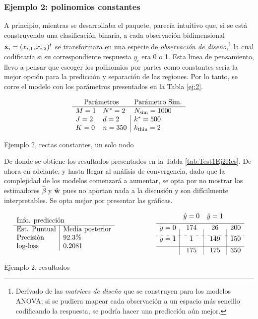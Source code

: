 \documentclass[../Main/Main.tex]{subfiles}
\begin{document}
\subsubsection*{Ejemplo 2: polinomios constantes}
A principio, mientras se desarrollaba el paquete, parecía intuitivo
que, si se está construyendo una clasificación binaria, a cada observación bidimensional $\mathbf{x}_i = (x_{i,1}, x_{i,2})^t$ se transformara en una especie de \textit{observación de diseño},\footnote{Derivado de las \textit{matrices de diseño} que se construyen para los modelos ANOVA; si se pudiera mapear cada observación a un espacio más sencillo codificando la respuesta, se podría hacer una predicción aún mejor.} la cual codificaría si su correspondiente respuesta $y_i$ era 0 o 1. Esta linea de pensamiento, llevo a pensar que escoger los polinomios por partes como constantes sería la mejor opción para la predicción y separación de las regiones. Por lo tanto, se corre el modelo con los parámetros presentados en la Tabla \ref{ej:2}.
\begin{table}[h]
$$\paramsmod{1}{2}{0}{2}{2}{350}{1000}{500}{2}$$
\caption{Ejemplo 2, rectas constantes, un solo nodo}
\label{ej:2}
\end{table}

De donde se obtiene los resultados presentados en la Tabla \ref{tab:Test1Ej2Res}. De ahora en adelante, y hasta llegar al análisis de convergencia, dado que la complejidad de los modelos comenzará a aumentar, se opta por no mostrar los estimadores $\hat{\beta}$ y $\hat{\mathbf{w}}$ pues no aportan nada a la discusión y son difícilmente interpretables. Se opta mejor por presentar las gráficas. 

\begin{table}[h]
\begin{align*}
\resultados{\text{Media posterior}}{92.3}{0.2081}
\qquad\qquad\qquad
\matconf{174}{26}{200}{1}{149}{150}{175}{175}{350}
\end{align*} 
\caption{Ejemplo 2, resultados}
\label{tab:Test1Ej2Res}
\end{table}
\end{document}
